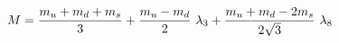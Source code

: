 \begin{equation}
M={m_u+m_d+m_s\over 3}
+{m_u-m_d\over 2}\ \lambda_3+{m_u+m_d-2 m_s\over 2\sqrt 3}\ \lambda_8
\end{equation} 

